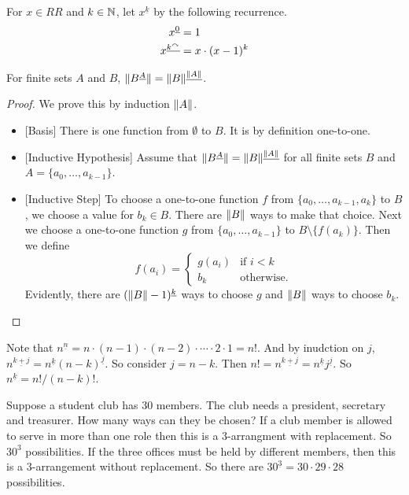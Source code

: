 \begin{defn}
	For $x\in RR$ and $k\in\mathbb N$, let $x^{\underline k}$ by the following recurrence.
	\begin{align*}
		x^{\underline 0} &= 1\\
		x^{\underline{k^\curvearrowright}} & = x\cdot (x-1)^k
	\end{align*}
\end{defn}

\begin{lemma}
	For finite sets $A$ and $B$, ${\lVert B^{\underline A}\rVert} = {\lVert B\rVert}^{\underline{{\lVert A\rVert}}}$. 
	
	\begin{proof}
		We prove this by induction  ${\lVert A\rVert}$.
		\begin{itemize}
			\item{}[Basis] There is one function from $\emptyset$ to $B$. It is by definition one-to-one.
			\item{}[Inductive Hypothesis] Assume that ${\lVert B^{\underline{A}}\rVert} = {\lVert B\rVert}^{\underline{{\lVert A\rVert}}}$
			for all finite sets $B$ and $A = \{a_0,\dotsc,a_{k-1}\}$.
			\item{}[Inductive Step] To choose a one-to-one function $f$ from $\{a_0,\dotsc,a_{k-1},a_k\}$ to $B$, we choose a value for $b_k\in B$. 
			There are ${\lVert B\rVert}$ ways to make that choice.
			Next we choose a one-to-one function $g$ from $\{a_0,\dotsc,a_{k-1}\}$ to $B\setminus\{f(a_k)\}$.
			Then we define 
			\[f(a_i)=\begin{cases}
			           g(a_i) &\text{if $i<k$}\\
			           b_k &\text{otherwise}.
			\end{cases}\]
			Evidently, there are $({\lVert B\rVert}-1)^{\underline k}$ ways to choose $g$ and ${\lVert B\rVert}$ ways to choose $b_k$.
		\end{itemize}
	\end{proof}
\end{lemma}

Note that $n^{\underline n} = n\cdot(n-1)\cdot(n-2)\cdot\dotsm\cdot 2\cdot1 = n!$. And by inudction on $j$, $n^{\underline{k+j}} = n^{\underline{k}}(n-k)^{\underline{j}}$. So consider $j=n-k$. Then $n!=n^{\underline{k+j}}=n^{\underline{k}}j^{\underline{j}}$.
So $n^{\underline{k}} = n!/(n-k)!$.

\begin{example}
	Suppose a student club has $30$ members.
	The club needs a president, secretary and treasurer.
	How many ways can they be chosen?
	If a club member is allowed to serve in more than one role then this is a $3$-arrangment with replacement. So $30^3$ possibilities.
	If the three offices must be held by different members, then this is a $3$-arrangement without replacement. So there are $30^{\underline 3} = 30\cdot29\cdot28$ possibilities. 
\end{example}

